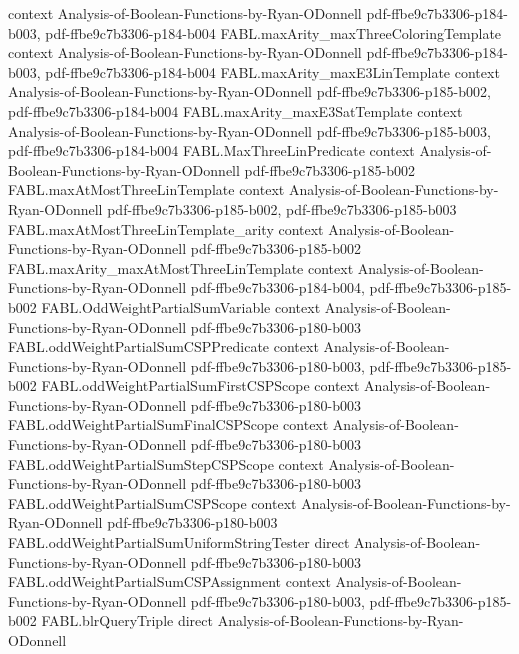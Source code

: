 \begin{theorem}
  {context}
  {Analysis-of-Boolean-Functions-by-Ryan-ODonnell}
  {pdf-ffbe9c7b3306-p184-b003,
    pdf-ffbe9c7b3306-p184-b004}
\proofstep
  {FABL.maxArity_maxThreeColoringTemplate}
  {context}
  {Analysis-of-Boolean-Functions-by-Ryan-ODonnell}
  {pdf-ffbe9c7b3306-p184-b003,
    pdf-ffbe9c7b3306-p184-b004}
\proofstep
  {FABL.maxArity_maxE3LinTemplate}
  {context}
  {Analysis-of-Boolean-Functions-by-Ryan-ODonnell}
  {pdf-ffbe9c7b3306-p185-b002,
    pdf-ffbe9c7b3306-p184-b004}
\proofstep
  {FABL.maxArity_maxE3SatTemplate}
  {context}
  {Analysis-of-Boolean-Functions-by-Ryan-ODonnell}
  {pdf-ffbe9c7b3306-p185-b003,
    pdf-ffbe9c7b3306-p184-b004}
\proofstep
  {FABL.MaxThreeLinPredicate}
  {context}
  {Analysis-of-Boolean-Functions-by-Ryan-ODonnell}
  {pdf-ffbe9c7b3306-p185-b002}
\proofstep
  {FABL.maxAtMostThreeLinTemplate}
  {context}
  {Analysis-of-Boolean-Functions-by-Ryan-ODonnell}
  {pdf-ffbe9c7b3306-p185-b002,
    pdf-ffbe9c7b3306-p185-b003}
\proofstep
  {FABL.maxAtMostThreeLinTemplate_arity}
  {context}
  {Analysis-of-Boolean-Functions-by-Ryan-ODonnell}
  {pdf-ffbe9c7b3306-p185-b002}
\proofstep
  {FABL.maxArity_maxAtMostThreeLinTemplate}
  {context}
  {Analysis-of-Boolean-Functions-by-Ryan-ODonnell}
  {pdf-ffbe9c7b3306-p184-b004,
    pdf-ffbe9c7b3306-p185-b002}
\proofstep
  {FABL.OddWeightPartialSumVariable}
  {context}
  {Analysis-of-Boolean-Functions-by-Ryan-ODonnell}
  {pdf-ffbe9c7b3306-p180-b003}
\proofstep
  {FABL.oddWeightPartialSumCSPPredicate}
  {context}
  {Analysis-of-Boolean-Functions-by-Ryan-ODonnell}
  {pdf-ffbe9c7b3306-p180-b003,
    pdf-ffbe9c7b3306-p185-b002}
\proofstep
  {FABL.oddWeightPartialSumFirstCSPScope}
  {context}
  {Analysis-of-Boolean-Functions-by-Ryan-ODonnell}
  {pdf-ffbe9c7b3306-p180-b003}
\proofstep
  {FABL.oddWeightPartialSumFinalCSPScope}
  {context}
  {Analysis-of-Boolean-Functions-by-Ryan-ODonnell}
  {pdf-ffbe9c7b3306-p180-b003}
\proofstep
  {FABL.oddWeightPartialSumStepCSPScope}
  {context}
  {Analysis-of-Boolean-Functions-by-Ryan-ODonnell}
  {pdf-ffbe9c7b3306-p180-b003}
\proofstep
  {FABL.oddWeightPartialSumCSPScope}
  {context}
  {Analysis-of-Boolean-Functions-by-Ryan-ODonnell}
  {pdf-ffbe9c7b3306-p180-b003}
\proofstep
  {FABL.oddWeightPartialSumUniformStringTester}
  {direct}
  {Analysis-of-Boolean-Functions-by-Ryan-ODonnell}
  {pdf-ffbe9c7b3306-p180-b003}
\proofstep
  {FABL.oddWeightPartialSumCSPAssignment}
  {context}
  {Analysis-of-Boolean-Functions-by-Ryan-ODonnell}
  {pdf-ffbe9c7b3306-p180-b003,
    pdf-ffbe9c7b3306-p185-b002}
\proofstep
  {FABL.blrQueryTriple}
  {direct}
  {Analysis-of-Boolean-Functions-by-Ryan-ODonnell}

\end{theorem}
